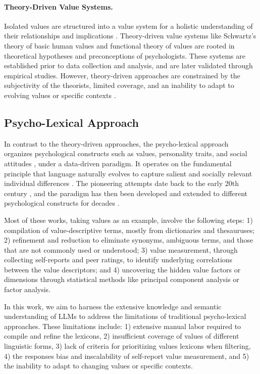 \paragraph{Theory-Driven Value Systems.}
Isolated values are structured into a value system for a holistic understanding of their relationships and implications \cite{schwartz2012overview}. Theory-driven value systems like Schwartz's theory of basic human values \cite{schwartz1992universals} and functional theory of values \cite{gouveia2014functional} are rooted in theoretical hypotheses and preconceptions of psychologists. These systems are established prior to data collection and analysis, and are later validated through empirical studies. However, theory-driven approaches are constrained by the subjectivity of the theorists, limited coverage, and an inability to adapt to evolving values or specific contexts \cite{ponizovskiy2020development, raad2017reply}.

\subsection{Psycho-Lexical Approach}
In contrast to the theory-driven approaches, the psycho-lexical approach organizes psychological constructs such as values, personality traits, and social attitudes \cite{aavik2002structure, crectu2012psycho, Klages1929-KLATSO-5, saucier2000isms}, under a data-driven paradigm. It operates on the fundamental principle that language naturally evolves to capture salient and socially relevant individual differences \cite{de2016values}.
The pioneering attempts date back to the early 20th century \cite{allport1936trait, galton1950character}, and the paradigm has then been developed and extended to different psychological constructs
for decades \cite{cattell1957personality, john1988lexical, aavik2002structure,ponizovskiy2020development, mai2023exploring, garrashi2024personality}.

Most of these works, taking values as an example, involve the following steps: 1) compilation of value-descriptive terms, mostly from dictionaries and thesauruses; 2) refinement and reduction to eliminate synonyms, ambiguous terms, and those that are not commonly used or understood; 3) value measurement, through collecting self-reports and peer ratings, to identify underlying correlations between the value descriptors; and 4) uncovering the hidden value factors or dimensions through statistical methods like principal component analysis or factor analysis.

In this work, we aim to harness the extensive knowledge and semantic understanding of LLMs to address the limitations of traditional psycho-lexical approaches. These limitations include: 1) extensive manual labor required to compile and refine the lexicons, 2) insufficient coverage of values of different linguistic forms, 3) lack of criteria for prioritizing values lexicons when filtering, 4) the responses bias and inscalability of self-report value measurement, and 5) the inability to adapt to changing values or specific contexts.


